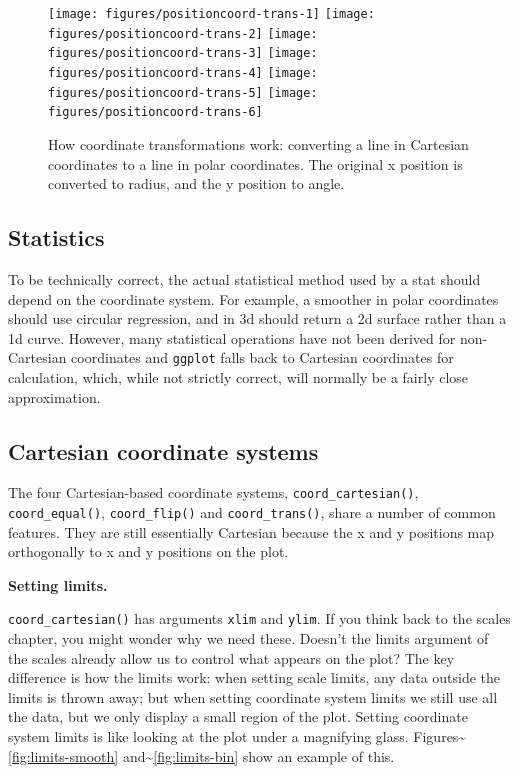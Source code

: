 \begin{figure}

{\centering \texttt{[image: figures/positioncoord-trans-1]} \texttt{[image: figures/positioncoord-trans-2]} \texttt{[image: figures/positioncoord-trans-3]} \texttt{[image: figures/positioncoord-trans-4]} \texttt{[image: figures/positioncoord-trans-5]} \texttt{[image: figures/positioncoord-trans-6]} 

}

\caption{How coordinate transformations work: converting a line in Cartesian coordinates to a line in polar coordinates.  The original x position is converted to radius, and the y position to angle.\label{fig:coord-trans}}
\end{figure}

\subsection{Statistics}\label{sub:statistics}

To be technically correct, the actual statistical method used by a stat
should depend on the coordinate system. For example, a smoother in polar
coordinates should use circular regression, and in 3d should return a 2d
surface rather than a 1d curve. However, many statistical operations
have not been derived for non-Cartesian coordinates and \texttt{ggplot}
falls back to Cartesian coordinates for calculation, which, while not
strictly correct, will normally be a fairly close approximation.

\subsection{Cartesian coordinate systems}\label{sub:cartesian}

The four Cartesian-based coordinate systems,
\texttt{coord\_cartesian()}, \texttt{coord\_equal()},
\texttt{coord\_flip()} and \texttt{coord\_trans()}, share a number of
common features. They are still essentially Cartesian because the x and
y positions map orthogonally to x and y positions on the plot.
 

\textbf{Setting limits.}

\texttt{coord\_cartesian()} has arguments \texttt{xlim} and
\texttt{ylim}. If you think back to the scales chapter, you might wonder
why we need these. Doesn't the limits argument of the scales already
allow us to control what appears on the plot? The key difference is how
the limits work: when setting scale limits, any data outside the limits
is thrown away; but when setting coordinate system limits we still use
all the data, but we only display a small region of the plot. Setting
coordinate system limits is like looking at the plot under a magnifying
glass. Figures\textasciitilde{}\ref{fig:limits-smooth}
and\textasciitilde{}\ref{fig:limits-bin} show an example of this.
 


